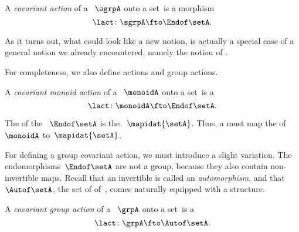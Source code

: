 \begin{ctdefinition}
    \label{def:semigroup-cov-action}
    A \emph{covariant  action} of a ~$\sgrpA$ onto a set~\setA is a  morphism
    \begin{equation}
        \label{eq:act-semigroup}
        \lact \colon \sgrpA \fto \Endof\setA.
    \end{equation}
\end{ctdefinition}

As it turns out, what could look like a new notion, is actually a special case of a general notion we already encountered, namely the notion of .

For completeness, we also define  actions and group actions.

\begin{ctdefinition}
    \label{def:monoid-cov-action}
    A \emph{covariant monoid action} of a  ~$\monoidA$ onto a set~\setA is a 
    \begin{equation}
        \label{eq:act-monoid}
        \lact \colon \monoidA \fto \Endof\setA.
    \end{equation}
\end{ctdefinition}

The  of the  ~$\Endof\setA$ is the ~$\mapidat{\setA}$.
Thus, a  must map the  of~$\monoidA$ to~$\mapidat{\setA}$.
%

For defining a group covariant action, we must introduce a slight variation.
The endomorphisms~$\Endof\setA$ are not a group, because they also contain non-invertible maps.
Recall that an invertible  is called an \emph{automorphism}, and that~$\Autof\setA$, the set of  of~\setA, comes naturally equipped with a  structure.


\begin{ctdefinition}
    \label{def:group-cov-action}
    A \emph{covariant group action} of a ~$\grpA$ onto a set~\setA is a 
    \begin{equation}
        \label{eq:act-group}
        \lact \colon \grpA \fto \Autof\setA.
    \end{equation}
\end{ctdefinition}

